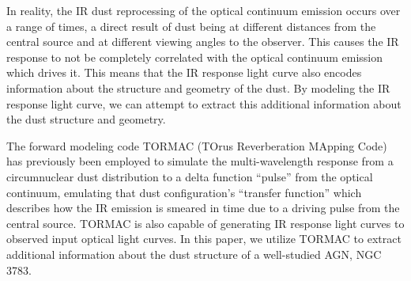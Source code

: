 \par In reality, the IR dust reprocessing of the optical continuum emission occurs over a range of times, a direct result of dust being at different distances from the central source and at different viewing angles to the observer. This causes the IR response to not be completely correlated with the optical continuum emission which drives it. This means that the IR response light curve also encodes information about the structure and geometry of the dust. By modeling the IR response light curve, we can attempt to extract this additional information about the dust structure and geometry.





\par The forward modeling code TORMAC (TOrus Reverberation MApping Code) has previously been employed to simulate the multi-wavelength response from a circumnuclear dust distribution to a delta function “pulse” from the optical continuum, emulating that dust configuration’s “transfer function” \citep{almeyda_modeling_2017,almeyda_modeling_2020} which describes how the IR emission is smeared in time due to a driving pulse from the central source. TORMAC is also capable of generating IR response light curves to observed input optical light curves.  In this paper, we utilize TORMAC to extract additional information about the dust structure of a well-studied AGN, NGC 3783.

